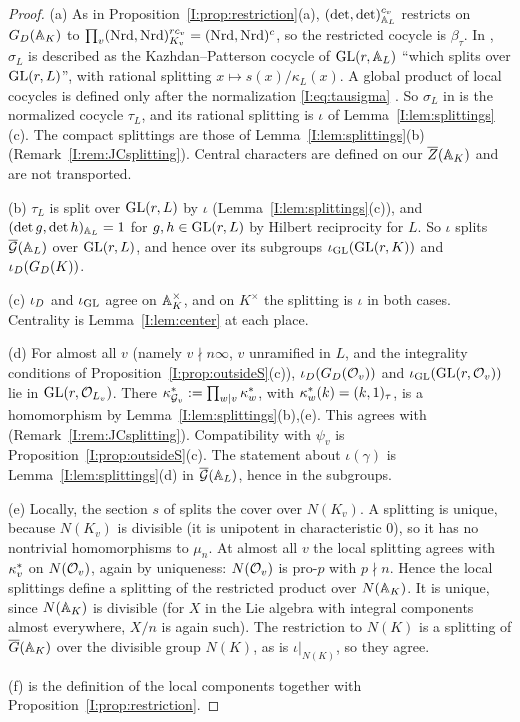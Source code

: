\begin{proof}
(a) As in Proposition~\ref{I:prop:restriction}(a), $(\det,\det)_{\mathbb{A}_L}^{c_v}$ restricts on $G_D(\mathbb{A}_K)$ to $\prod_v(\operatorname{Nrd},\operatorname{Nrd})_{K_v}^{rc_v}=(\operatorname{Nrd},\operatorname{Nrd})^c$, so the restricted cocycle is $\beta_\tau$. In \cite{JC26a}, $\sigma_L$ is described as the Kazhdan--Patterson cocycle of $\mathrm{GL}(r,\mathbb{A}_L)$ ``which splits over $\mathrm{GL}(r,L)$'', with rational splitting $x\mapsto s(x)/\kappa_L(x)$. A global product of local cocycles is defined only after the normalization \eqref{I:eq:tausigma} \cite[\S2]{FK86}. So $\sigma_L$ in \cite{JC26a} is the normalized cocycle $\tau_L$, and its rational splitting is $\iota$ of Lemma~\ref{I:lem:splittings}(c). The compact splittings are those of Lemma~\ref{I:lem:splittings}(b) (Remark~\ref{I:rem:JCsplitting}). Central characters are defined on our $\overline{Z}(\mathbb{A}_K)$ and are not transported.

(b) $\tau_L$ is split over $\mathrm{GL}(r,L)$ by $\iota$ (Lemma~\ref{I:lem:splittings}(c)), and $(\det g,\det h)_{\mathbb{A}_L}=1$ for $g,h\in\mathrm{GL}(r,L)$ by Hilbert reciprocity for $L$. So $\iota$ splits $\overline{\mathcal{G}}(\mathbb{A}_L)$ over $\mathrm{GL}(r,L)$, and hence over its subgroups $\iota_{\mathrm{GL}}(\mathrm{GL}(r,K))$ and $\iota_D(G_D(K))$.

(c) $\iota_D$ and $\iota_{\mathrm{GL}}$ agree on $\mathbb{A}_K^\times$, and on $K^\times$ the splitting is $\iota$ in both cases. Centrality is Lemma~\ref{I:lem:center} at each place.

(d) For almost all $v$ (namely $v\nmid n\infty$, $v$ unramified in $L$, and the integrality conditions of Proposition~\ref{I:prop:outsideS}(c)), $\iota_D(G_D(\mathcal{O}_v))$ and $\iota_{\mathrm{GL}}(\mathrm{GL}(r,\mathcal{O}_v))$ lie in $\mathrm{GL}(r,\mathcal{O}_{L_v})$. There $\kappa^{*}_{\mathcal{G}_v}:=\prod_{w\mid v}\kappa^{*}_w$, with $\kappa^{*}_w(k)=(k,1)_\tau$, is a homomorphism by Lemma~\ref{I:lem:splittings}(b),(e). This agrees with \cite[Lemma~6.1(d)]{JC26a} (Remark~\ref{I:rem:JCsplitting}). Compatibility with $\psi_v$ is Proposition~\ref{I:prop:outsideS}(c). The statement about $\iota(\gamma)$ is Lemma~\ref{I:lem:splittings}(d) in $\overline{\mathcal{G}}(\mathbb{A}_L)$, hence in the subgroups.

(e) Locally, the section $s$ of \cite[\S2]{FK86} splits the cover over $N(K_v)$. A splitting is unique, because $N(K_v)$ is divisible (it is unipotent in characteristic $0$), so it has no nontrivial homomorphisms to $\mu_n$. At almost all $v$ the local splitting agrees with $\kappa^{*}_v$ on $N(\mathcal{O}_v)$, again by uniqueness: $N(\mathcal{O}_v)$ is pro-$p$ with $p\nmid n$. Hence the local splittings define a splitting of the restricted product over $N(\mathbb{A}_K)$. It is unique, since $N(\mathbb{A}_K)$ is divisible (for $X$ in the Lie algebra with integral components almost everywhere, $X/n$ is again such). The restriction to $N(K)$ is a splitting of $\overline{G}(\mathbb{A}_K)$ over the divisible group $N(K)$, as is $\iota|_{N(K)}$, so they agree.

(f) is the definition of the local components together with Proposition~\ref{I:prop:restriction}.
\end{proof}

